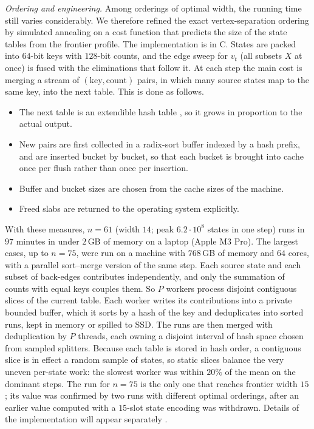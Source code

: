 \emph{Ordering and engineering.} Among orderings of optimal width, the running time still
varies considerably. We therefore refined the exact vertex-separation ordering by simulated
annealing on a cost function that predicts the size of the state tables from the frontier
profile. The implementation is in C. States are packed into $64$-bit keys with $128$-bit counts,
and the edge sweep for $v_t$ (all subsets $X$ at once) is fused with the eliminations that
follow it. At each step the main cost is merging a stream of $(\text{key},\text{count})$ pairs,
in which many source states map to the same key, into the next table. This is done as follows.
\begin{itemize}
\item The next table is an extendible hash table \cite{Fagin}, so it grows in proportion to the
actual output.
\item New pairs are first collected in a radix-sort buffer indexed by a hash prefix, and are
inserted bucket by bucket, so that each bucket is brought into cache once per flush rather than
once per insertion.
\item Buffer and bucket sizes are chosen from the cache sizes of the machine.
\item Freed slabs are returned to the operating system explicitly.
\end{itemize}
With these measures, $n=61$ (width $14$; peak $6.2\cdot10^8$ states in one step) runs in
$97$ minutes in under $2$\,GB of memory on a laptop (Apple M3 Pro). The largest cases, up to $n=75$, were run on a machine with $768$\,GB of memory and $64$ cores,
with a parallel sort--merge version of the same step. Each source state and each subset of
back-edges contributes independently, and only the summation of counts with equal keys couples
them. So $P$ workers process disjoint contiguous slices of the current table. Each worker writes
its contributions into a private bounded buffer, which it sorts by a hash of the key and
deduplicates into sorted runs, kept in memory or spilled to SSD. The runs are then merged with
deduplication by $P$ threads, each owning a disjoint interval of hash space chosen from sampled
splitters. Because each table is stored in hash order, a contiguous slice is in effect a random
sample of states, so static slices balance the very uneven per-state work: the slowest worker
was within $20\%$ of the mean on the dominant steps. The run for $n=75$ is the only one that
reaches frontier width $15$; its value was confirmed by two runs with different optimal
orderings, after an earlier value computed with a $15$-slot state encoding was withdrawn. Details of the implementation will appear separately \cite{MillerEngineering}.

